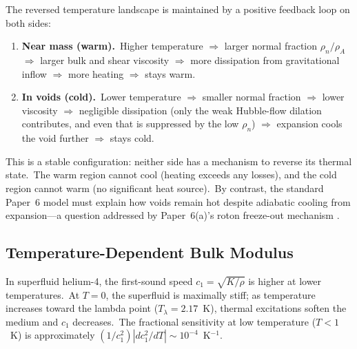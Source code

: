 \documentclass[12pt,letterpaper]{article}
\newcommand{\rhoa}{\rho_{\!A}}
\begin{document}
The reversed temperature landscape is maintained by a positive feedback loop
on both sides:

\begin{enumerate}[leftmargin=2em]
  \item \textbf{Near mass (warm).}\ Higher temperature $\Rightarrow$ larger
    normal fraction $\rho_n/\rhoa$ $\Rightarrow$ larger bulk and shear
    viscosity $\Rightarrow$ more dissipation from gravitational inflow
    $\Rightarrow$ more heating $\Rightarrow$ stays warm.

  \item \textbf{In voids (cold).}\ Lower temperature $\Rightarrow$ smaller
    normal fraction $\Rightarrow$ lower viscosity $\Rightarrow$ negligible
    dissipation (only the weak Hubble-flow dilation contributes, and even that
    is suppressed by the low $\rho_n$) $\Rightarrow$ expansion cools the void
    further $\Rightarrow$ stays cold.
\end{enumerate}

This is a stable configuration: neither side has a mechanism to reverse its
thermal state.\ The warm region cannot cool (heating exceeds any losses),
and the cold region cannot warm (no significant heat source).\ By contrast,
the standard Paper~6 model must explain how voids remain hot despite
adiabatic cooling from expansion---a question addressed by Paper~6(a)'s
roton freeze-out mechanism \cite{otto-cooling}.


\subsection{Temperature-Dependent Bulk Modulus}
\label{sec:KA-T}

In superfluid helium-4, the first-sound speed $c_1 = \sqrt{K/\rho}$ is
higher at lower temperatures.\ At $T = 0$, the superfluid is maximally
stiff; as temperature increases toward the lambda point ($T_\lambda =
2.17$~K), thermal excitations soften the medium and $c_1$ decreases.\ The
fractional sensitivity at low temperature ($T < 1$~K) is approximately
$(1/c_1^2)|dc_1^2/dT| \sim 10^{-4}$~K$^{-1}$.
\end{document}
